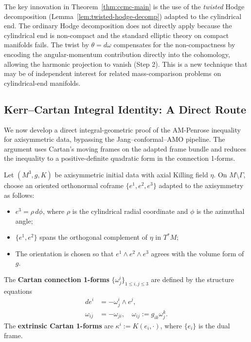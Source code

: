 \begin{remark}
The key innovation in Theorem~\ref{thm:ccmc-main} is the use of the \emph{twisted} Hodge decomposition (Lemma~\ref{lem:twisted-hodge-decomp}) adapted to the cylindrical end. The ordinary Hodge decomposition does not directly apply because the cylindrical end is non-compact and the standard elliptic theory on compact manifolds fails. The twist by $\theta = d\omega$ compensates for the non-compactness by encoding the angular-momentum contribution directly into the cohomology, allowing the harmonic projection to vanish (Step 2). This is a new technique that may be of independent interest for related mass-comparison problems on cylindrical-end manifolds.
\end{remark}

\subsection{Kerr--Cartan Integral Identity: A Direct Route}

We now develop a direct integral-geometric proof of the AM-Penrose inequality for axisymmetric data, bypassing the Jang--conformal--AMO pipeline. The argument uses Cartan's moving frames on the adapted frame bundle and reduces the inequality to a positive-definite quadratic form in the connection 1-forms.

\begin{definition}\label{def:cartan-frame}
Let $(M^3, g, K)$ be axisymmetric initial data with axial Killing field $\eta$. On $M \setminus \Gamma$, choose an oriented orthonormal coframe $\{e^1, e^2, e^3\}$ adapted to the axisymmetry as follows:
\begin{itemize}
    \item $e^3 = \rho \, d\phi$, where $\rho$ is the cylindrical radial coordinate and $\phi$ is the azimuthal angle;
    \item $\{e^1, e^2\}$ spans the orthogonal complement of $\eta$ in $T^*M$;
    \item The orientation is chosen so that $e^1 \wedge e^2 \wedge e^3$ agrees with the volume form of $g$.
\end{itemize}
The \textbf{Cartan connection 1-forms} $\{\omega^i_j\}_{1 \leq i, j \leq 3}$ are defined by the structure equations
\begin{align}
de^i &= -\omega^i_j \wedge e^j, \\
\omega_{ij} &= -\omega_{ji}, \quad \omega_{ij} := g_{ik}\omega^k_j.
\end{align}
The \textbf{extrinsic Cartan 1-forms} are $\kappa^i := K(e_i, \cdot)$, where $\{e_i\}$ is the dual frame.
\end{definition}

